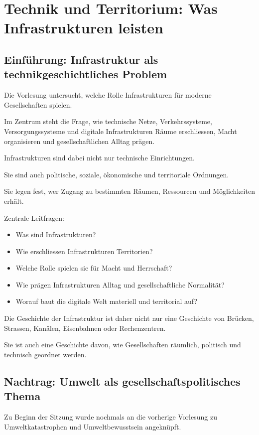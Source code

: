 \section{Technik und Territorium: Was Infrastrukturen leisten}

\subsection{Einführung: Infrastruktur als technikgeschichtliches Problem}

Die Vorlesung untersucht,
welche Rolle Infrastrukturen für moderne Gesellschaften spielen.

Im Zentrum steht die Frage,
wie technische Netze,
Verkehrssysteme,
Versorgungssysteme
und digitale Infrastrukturen
Räume erschliessen,
Macht organisieren
und gesellschaftlichen Alltag prägen.

Infrastrukturen sind dabei nicht nur technische Einrichtungen.

Sie sind auch politische,
soziale,
ökonomische
und territoriale Ordnungen.

Sie legen fest,
wer Zugang zu bestimmten Räumen,
Ressourcen
und Möglichkeiten erhält.

Zentrale Leitfragen:

\begin{itemize}
\item Was sind Infrastrukturen?
\item Wie erschliessen Infrastrukturen Territorien?
\item Welche Rolle spielen sie für Macht und Herrschaft?
\item Wie prägen Infrastrukturen Alltag und gesellschaftliche Normalität?
\item Worauf baut die digitale Welt materiell und territorial auf?
\end{itemize}

Die Geschichte der Infrastruktur ist daher
nicht nur eine Geschichte von Brücken,
Strassen,
Kanälen,
Eisenbahnen
oder Rechenzentren.

Sie ist auch eine Geschichte davon,
wie Gesellschaften räumlich,
politisch
und technisch geordnet werden.

\subsection{Nachtrag: Umwelt als gesellschaftspolitisches Thema}

Zu Beginn der Sitzung wurde nochmals
an die vorherige Vorlesung
zu Umweltkatastrophen und Umweltbewusstsein angeknüpft.

